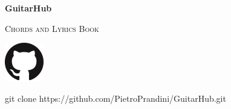 
\begin{titlepage}
	\centering
	{\sffamily\huge\bfseries GuitarHub\par}
	{\ttfamily\scshape\Large Chords and Lyrics Book\par}
	\includegraphics[scale=1]{img/GitHub-Mark/PNG/GitHub-Mark-64px.png}\par %
	{\ttfamily\footnotesize git clone https://github.com/PietroPrandini/GuitarHub.git\par}
\end{titlepage}

